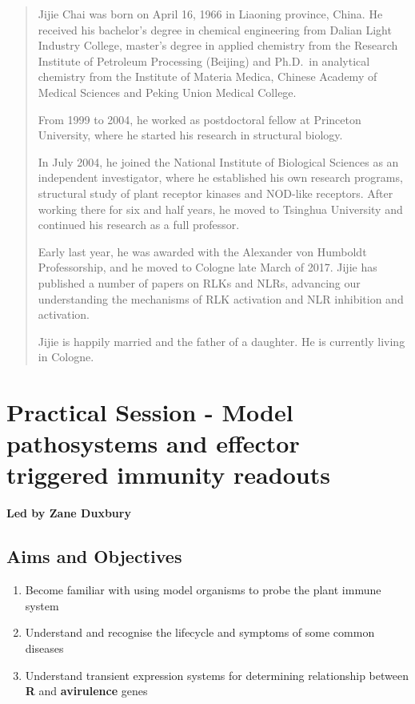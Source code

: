 \documentclass[12pt,]{book}
\providecommand{\tightlist}{%
  \setlength{\itemsep}{0pt}\setlength{\parskip}{0pt}}
\begin{document}
\begin{quote}
Jijie Chai was born on April 16, 1966 in Liaoning province, China. He
received his bachelor's degree in chemical engineering from Dalian Light
Industry College, master's degree in applied chemistry from the Research
Institute of Petroleum Processing (Beijing) and Ph.D.~in analytical
chemistry from the Institute of Materia Medica, Chinese Academy of
Medical Sciences and Peking Union Medical College.

From 1999 to 2004, he worked as postdoctoral fellow at Princeton
University, where he started his research in structural biology.

In July 2004, he joined the National Institute of Biological Sciences as
an independent investigator, where he established his own research
programs, structural study of plant receptor kinases and NOD-like
receptors. After working there for six and half years, he moved to
Tsinghua University and continued his research as a full professor.

Early last year, he was awarded with the Alexander von Humboldt
Professorship, and he moved to Cologne late March of 2017. Jijie has
published a number of papers on RLKs and NLRs, advancing our
understanding the mechanisms of RLK activation and NLR inhibition and
activation.

Jijie is happily married and the father of a daughter. He is currently
living in Cologne.
\end{quote}

\section*{Practical Session - Model pathosystems and effector triggered
immunity
readouts}\label{practical-session---model-pathosystems-and-effector-triggered-immunity-readouts}

\textbf{Led by Zane Duxbury}

\subsection*{Aims and Objectives}\label{aims-and-objectives}

\begin{enumerate}
\def\labelenumi{\arabic{enumi}.}
\tightlist
\item
  Become familiar with using model organisms to probe the plant immune
  system
\item
  Understand and recognise the lifecycle and symptoms of some common
  diseases
\item
  Understand transient expression systems for determining relationship
  between \textbf{R} and \textbf{avirulence} genes
\end{enumerate}
\end{document}
